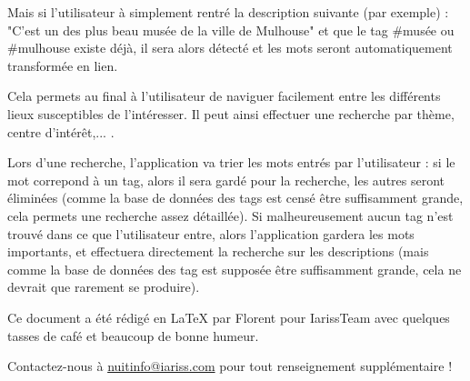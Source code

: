 \documentclass[12pt, a4paper]{article}
\newcommand{\espace}{\vspace{.8cm}}
\newcommand{\authors}{Florent}
\begin{document}
Mais si l'utilisateur à simplement rentré la description suivante (par exemple) : "C'est un des plus beau musée de la ville de Mulhouse" et que le tag \#musée ou \#mulhouse existe déjà, il sera alors détecté et les mots seront automatiquement transformée en lien.

Cela permets au final à l'utilisateur de naviguer facilement entre les différents lieux susceptibles de l'intéresser. Il peut ainsi effectuer une recherche par thème, centre d'intérêt,... .

Lors d'une recherche, l'application va trier les mots entrés par l'utilisateur :  si le mot correpond à un tag, alors il sera gardé pour la recherche, les autres seront éliminées (comme la base de données des tags est censé être suffisamment grande, cela permets une recherche assez détaillée). Si malheureusement aucun tag n'est trouvé dans ce que l'utilisateur entre, alors l'application gardera les mots importants, et effectuera directement la recherche sur les descriptions (mais comme la base de données des tag est supposée être suffisamment grande, cela ne devrait que rarement se produire).


\espace\vfill{}
Ce document a été rédigé en \LaTeX{} par \authors{} pour IarissTeam avec quelques tasses de café et beaucoup de bonne humeur.

Contactez-nous à \href{mailto:nuitinfo@iariss.com}{nuitinfo@iariss.com} pour tout renseignement supplémentaire !
\end{document}
